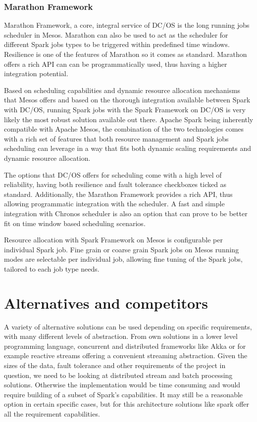 \documentclass[a4paper, 10 pt, conference]{IEEEtran}
\begin{document}
\subsubsection{Marathon Framework}
Marathon Framework, a core, integral service of DC/OS is the long running jobs scheduler in Mesos. Marathon can also be used to act as the scheduler for different Spark jobs types to be triggered within predefined time windows. Resilience is one of the features of Marathon so it comes as standard. Marathon offers a rich API can can be programmatically used, thus having a higher integration potential.

Based on scheduling capabilities and dynamic resource allocation mechanisms that Mesos offers and based on the thorough integration available between Spark with DC/OS, running Spark jobs with the Spark Framework on DC/OS is very likely the most robust solution available out there. Apache Spark being inherently compatible with Apache Mesos, the combination of the two technologies comes with a rich set of features that both resource management and Spark jobs scheduling can leverage in a way that fits both dynamic scaling requirements and dynamic resource allocation.

The options that DC/OS offers for scheduling come with a high level of reliability, having both resilience and fault tolerance checkboxes ticked as standard. Additionally, the Marathon Framework provides a rich API, thus allowing programmatic integration with the scheduler. A fast and simple integration with Chronos scheduler is also an option that can prove to be better fit on time window based scheduling scenarios.

Resource allocation with Spark Framework on Mesos is configurable per individual Spark job. Fine grain or coarse grain Spark jobs on Mesos running modes are selectable per individual job, allowing fine tuning of the Spark jobs, tailored to each job type needs.

\section{Alternatives and competitors}
A variety of alternative solutions can be used depending on specific requirements, with many different levels of abstraction. From own solutions in a lower level programming language, concurrent and distributed frameworks like Akka or for example reactive streams offering a convenient streaming abstraction. Given the sizes of the data, fault tolerance and other requirements of the project in question, we need to be looking at distributed stream and batch processing solutions. Otherwise the implementation would be time consuming and would require building of a subset of Spark's capabilities. It may still be a reasonable option in certain specific cases, but for this architecture solutions like spark offer all the requirement capabilities.
\end{document}
